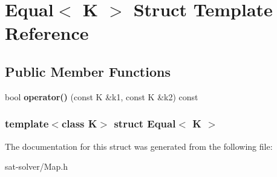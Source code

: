 \hypertarget{structEqual}{\section{\-Equal$<$ \-K $>$ \-Struct \-Template \-Reference}
\label{structEqual}
}
\subsection*{\-Public \-Member \-Functions}
\begin{DoxyCompactItemize}
\item 
\hypertarget{structEqual_aa134c69e7d7d04ac58043ed7f127e8d5}{bool {\bfseries operator()} (const \-K \&k1, const \-K \&k2) const }\label{structEqual_aa134c69e7d7d04ac58043ed7f127e8d5}

\end{DoxyCompactItemize}
\subsubsection*{template$<$class K$>$ struct Equal$<$ K $>$}



\-The documentation for this struct was generated from the following file\-:\begin{DoxyCompactItemize}
\item 
sat-\/solver/\-Map.\-h\end{DoxyCompactItemize}
